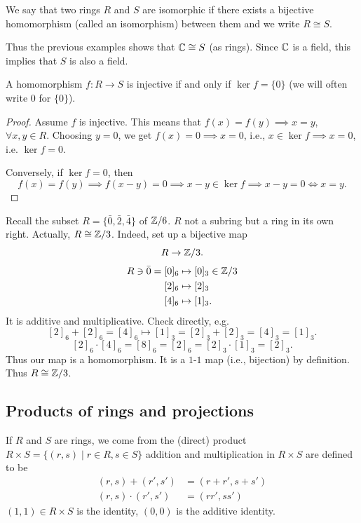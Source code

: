 \documentclass[10pt, a4paper]{article}
\begin{document}
\begin{definition}
    We say that two rings $R$ and $S$ are isomorphic if there exists a bijective homomorphism
    (called an isomorphism)
    between them and we write $R \cong S$.
\end{definition}

Thus the previous examples shows that $\mathbb{C} \cong S$
(as rings).
Since $\mathbb{C}$ is a field,
this implies that $S$ is also a field.

\begin{lemma}
    A homomorphism $f : R \to S$ is injective if and only if $\ker{f} = \{0\}$
    (we will often write $0$ for $\{0\}$).

    \begin{proof}
        Assume $f$ is injective.
        This means that $f(x) = f(y) \implies x = y$,
        $\forall x, y \in R$.
        Choosing $y = 0$,
        we get $f(x) = 0 \implies x = 0$,
        i.e.,
        $x \in \ker{f} \implies x = 0$,
        i.e. $\ker{f} = 0$.

        Conversely,
        if $\ker{f} = 0$,
        then
        \[
        f(x) = f(y) \implies f(x - y) = 0 \implies x - y \in \ker{f} \implies x - y = 0 \iff x = y.
        \]
    \end{proof}
\end{lemma}

\begin{example}
    Recall the subset $R = \{\bar{0}, \bar{2}, \bar{4}\}$ of $\mathbb{Z} / 6$.
    $R$ not a subring but a ring in its own right.
    Actually,
    $R \cong \mathbb{Z} / 3$.
    Indeed,
    set up a bijective map
    \[
    R \to \mathbb{Z} / 3.
    \]
    \begin{align*}
        R \ni \bar{0} = [0]_{6} &\mapsto [0]_3 \in \mathbb{Z} / 3 \\
        [2]_{6} &\mapsto [2]_3 \\
        [4]_{6} &\mapsto [1]_3.
    \end{align*}
    It is additive and multiplicative.
    Check directly,
    e.g.
    \[
    [2]_6 + [2]_6 = [4]_6 \mapsto [1]_3 = [2]_3 + [2]_3 = [4]_3 = [1]_3.
    \]
    \[
    [2]_6 \cdot [4]_6 = [8]_6 = [2]_6 = [2]_3 \cdot [1]_3 = [2]_3.
    \]
    Thus our map is a homomorphism.
    It is a $1$-$1$ map
    (i.e.,
    bijection)
    by definition.
    Thus $R \cong \mathbb{Z} / 3$.
\end{example}

\subsection{Products of rings and projections}
If $R$ and $S$ are rings,
we come from the
(direct)
product $R \times S = \{(r, s) \mid r \in R, s \in S\}$ addition and multiplication in $R \times S$ are defined to be
\begin{align*}
    (r, s) + (r', s') &= (r + r', s + s') \\
    (r, s)\cdot (r', s') &= (rr', ss')
\end{align*}
$(1, 1) \in R \times S$ is the identity,
$(0, 0)$ is the additive identity.
\end{document}
